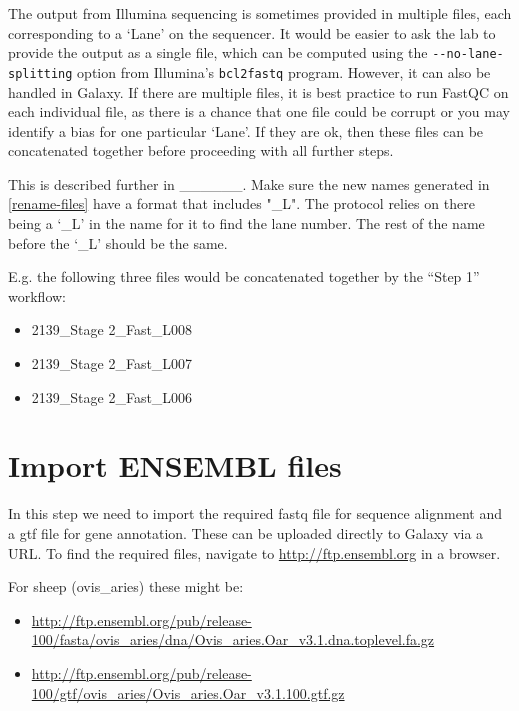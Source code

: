 \documentclass[
]{book}
\providecommand{\tightlist}{%
  \setlength{\itemsep}{0pt}\setlength{\parskip}{0pt}}
\begin{document}
The output from Illumina sequencing is sometimes provided in multiple files, each corresponding to a `Lane' on the sequencer. It would be easier to ask the lab to provide the output as a single file, which can be computed using the \texttt{-\/-no-lane-splitting} option from Illumina's \texttt{bcl2fastq} program. However, it can also be handled in Galaxy. If there are multiple files, it is best practice to run FastQC on each individual file, as there is a chance that one file could be corrupt or you may identify a bias for one particular `Lane'. If they are ok, then these files can be concatenated together before proceeding with all further steps.

This is described further in \_\_\_\_\_\_. Make sure the new names generated in \ref{rename-files} have a format that includes "\_L". The protocol relies on there being a `\_L' in the name for it to find the lane number. The rest of the name before the `\_L' should be the same.

E.g. the following three files would be concatenated together by the ``Step 1'' workflow:

\begin{itemize}
\tightlist
\item
  2139\_Stage 2\_Fast\_L008
\item
  2139\_Stage 2\_Fast\_L007
\item
  2139\_Stage 2\_Fast\_L006
\end{itemize}

\hypertarget{import-ensembl-files}{%
\section{Import ENSEMBL files}\label{import-ensembl-files}}

In this step we need to import the required fastq file for sequence alignment and a gtf file for gene annotation.
These can be uploaded directly to Galaxy via a URL. To find the required files, navigate to \url{http://ftp.ensembl.org} in a browser.

For sheep (ovis\_aries) these might be:

\begin{itemize}
\tightlist
\item
  \url{http://ftp.ensembl.org/pub/release-100/fasta/ovis_aries/dna/Ovis_aries.Oar_v3.1.dna.toplevel.fa.gz}
\item
  \url{http://ftp.ensembl.org/pub/release-100/gtf/ovis_aries/Ovis_aries.Oar_v3.1.100.gtf.gz}
\end{itemize}
\end{document}
